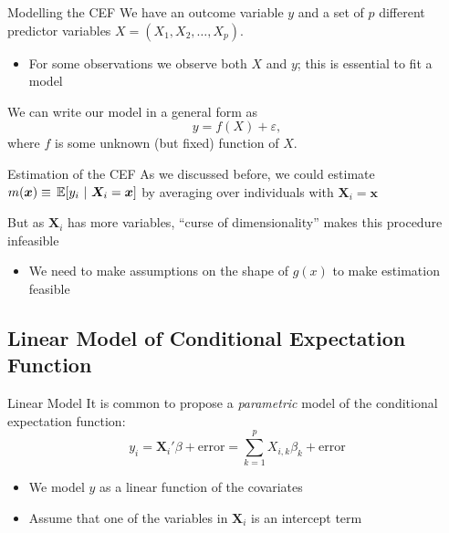\documentclass[aspectratio=169,t,11pt,table]{beamer}
\begin{document}
\begin{frame}{Modelling the CEF}
  We have an outcome variable $y$ and a set of $p$ different predictor variables $X = (X_1, X_2, \dots, X_p)$. 
  \begin{itemize}
    \item For some observations we observe both $X$ and $y$; this is essential to \alert{fit} a model
  \end{itemize}

  \bigskip
  We can write our model in a general form as
  $$
    y = f(X) + \varepsilon,
  $$
  where $f$ is some unknown (but fixed) function of $X$. 
\end{frame}

\begin{frame}{Estimation of the CEF}
  As we discussed before, we could estimate $m(\bm{x}) \equiv \expec{y_i}{\bm{X}_i = \bm{x}}$ by averaging over individuals with $\bm{X}_i = \bm{x}$

  \bigskip
  But as $\bm{X}_i$ has more variables, ``curse of dimensionality'' makes this procedure infeasible
  \begin{itemize}
    \item We need to make assumptions on the shape of $g(x)$ to make estimation feasible
  \end{itemize}
\end{frame}


\subsection{Linear Model of Conditional Expectation Function}

\begin{frame}{Linear Model}
  It is common to propose a \emph{parametric} model of the conditional expectation function:
  $$
    y_i = 
    \bm{X}_i' \beta + \text{error} = 
    \sum_{k=1}^p X_{i,k} \beta_k + \text{error}
  $$
  \begin{itemize}
    \item We model $y$ as a linear function of the covariates

    \item Assume that one of the variables in $\bm{X}_i$ is an intercept term
  \end{itemize}
\end{frame}
\end{document}
